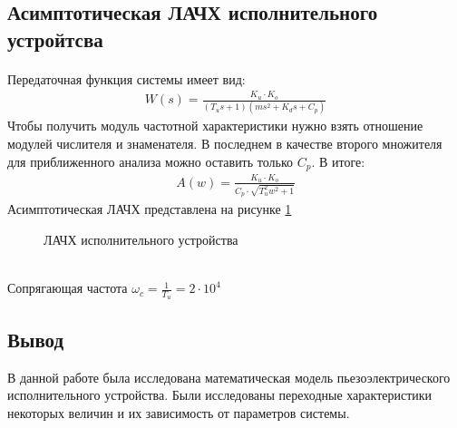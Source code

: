 \documentclass[a4paper,12pt]{article}
\begin{document}
	\newpage
	\begin{center}
		\section{Асимптотическая ЛАЧХ исполнительного устройтсва}
	\end{center}
	\paragraph{}
	Передаточная функция системы имеет вид:
	\begin{gather}
	 W(s)=\frac{K_u\cdot K_o}{(T_u s+1)(ms^2+K_d s+C_p)}
	\end{gather}
	Чтобы получить модуль частотной характеристики нужно взять отношение модулей числителя и знаменателя. В последнем в качестве второго множителя для приближенного анализа можно оставить только $C_p$. В итоге:
	\begin{gather}
	\displaystyle
	A(w)=\frac{K_u\cdot K_o}{C_p\cdot \sqrt{T_u^2 w^2+1}}
	\end{gather}	
	Асимптотическая ЛАЧХ представлена на рисунке \ref{s_7}
	\begin{figure}[h!]
			
		\centering
		
		\caption{ЛАЧХ исполнительного устройства}
			\label{s_7}
	\end{figure}
	\\
	Сопрягающая частота $\displaystyle \omega_c=\frac{1}{T_u}=2\cdot10^4$
		\newpage
	\begin{center}
		\section*{Вывод} 
	\end{center}
	\par
	В данной работе была исследована математическая модель пьезоэлектрического исполнительного устройства. Были исследованы переходные характеристики некоторых величин и их зависимость от параметров системы.
\end{document}
